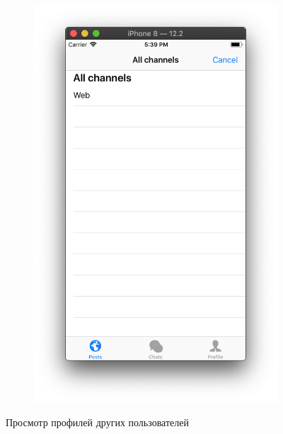 \documentclass[a4paper,12pt]{article}
\begin{document}
\begin{figure}[h!]
\begin{subfigure}[b]{0.3\linewidth}
		\includegraphics[width=\linewidth]{../includes/pmi/addtoachannel.png}
	\end{subfigure}
	\caption{\label{pic: otherprofile} Просмотр профилей других пользователей}
	\end{figure}
	\clearpage
\end{document}
